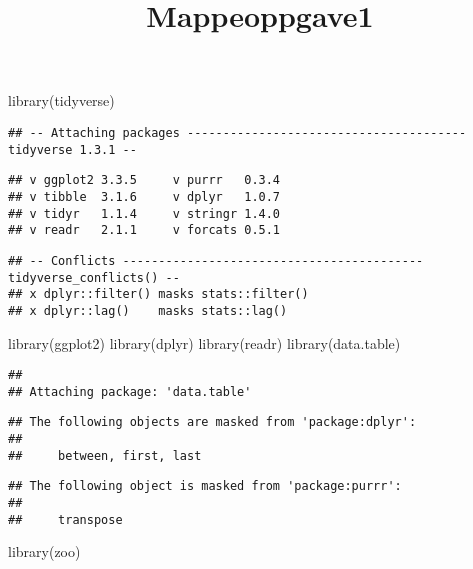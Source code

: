 \documentclass[
]{article}
\title{Mappeoppgave1}
\author{}
\date{\vspace{-2.5em}}
\newenvironment{Shaded}{\begin{snugshade}}{\end{snugshade}}
\newcommand{\FunctionTok}[1]{\textcolor[rgb]{0.00,0.00,0.00}{#1}}
\newcommand{\NormalTok}[1]{#1}
\begin{document}
\maketitle

\begin{Shaded}
\begin{Highlighting}[]
\FunctionTok{library}\NormalTok{(tidyverse)}
\end{Highlighting}
\end{Shaded}

\begin{verbatim}
## -- Attaching packages --------------------------------------- tidyverse 1.3.1 --
\end{verbatim}

\begin{verbatim}
## v ggplot2 3.3.5     v purrr   0.3.4
## v tibble  3.1.6     v dplyr   1.0.7
## v tidyr   1.1.4     v stringr 1.4.0
## v readr   2.1.1     v forcats 0.5.1
\end{verbatim}

\begin{verbatim}
## -- Conflicts ------------------------------------------ tidyverse_conflicts() --
## x dplyr::filter() masks stats::filter()
## x dplyr::lag()    masks stats::lag()
\end{verbatim}

\begin{Shaded}
\begin{Highlighting}[]
\FunctionTok{library}\NormalTok{(ggplot2)}
\FunctionTok{library}\NormalTok{(dplyr)}
\FunctionTok{library}\NormalTok{(readr)}
\FunctionTok{library}\NormalTok{(data.table)}
\end{Highlighting}
\end{Shaded}

\begin{verbatim}
## 
## Attaching package: 'data.table'
\end{verbatim}

\begin{verbatim}
## The following objects are masked from 'package:dplyr':
## 
##     between, first, last
\end{verbatim}

\begin{verbatim}
## The following object is masked from 'package:purrr':
## 
##     transpose
\end{verbatim}

\begin{Shaded}
\begin{Highlighting}[]
\FunctionTok{library}\NormalTok{(zoo)}
\end{Highlighting}
\end{Shaded}
\end{document}
